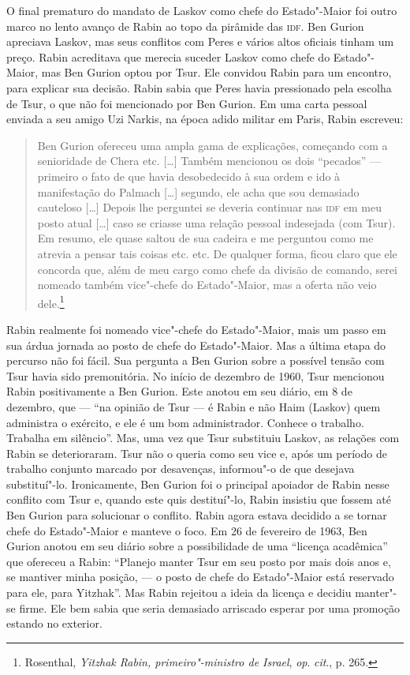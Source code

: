 O final prematuro do mandato de Laskov como chefe do Estado"-Maior foi
outro marco no lento avanço de Rabin ao topo da pirâmide das \textsc{idf}. Ben
Gurion apreciava Laskov, mas seus conflitos com Peres e vários altos
oficiais tinham um preço. Rabin acreditava que merecia suceder Laskov
como chefe do Estado"-Maior, mas Ben Gurion optou por Tsur. Ele convidou
Rabin para um encontro, para explicar sua decisão. Rabin sabia que Peres
havia pressionado pela escolha de Tsur, o que não foi mencionado por Ben
Gurion. Em uma carta pessoal enviada a seu amigo Uzi Narkis, na época
adido militar em Paris, Rabin escreveu: 

\begin{quote}
Ben Gurion ofereceu uma ampla
gama de explicações, começando com a senioridade de Chera etc. {[}\ldots{}{]}
Também mencionou os dois ``pecados'' --- primeiro o fato de que havia
desobedecido à sua ordem e ido à manifestação do Palmach {[}\ldots{}{]} segundo, ele
acha que sou demasiado cauteloso {[}\ldots{}{]} Depois lhe perguntei se deveria
continuar nas \textsc{idf} em meu posto atual {[}\ldots{}{]} caso se criasse uma relação
pessoal indesejada (com Tsur). Em resumo, ele quase saltou de sua
cadeira e me perguntou como me atrevia a pensar tais coisas etc. etc.
De qualquer forma, ficou claro que ele concorda que, além de meu cargo
como chefe da divisão de comando, serei nomeado também vice"-chefe do
Estado"-Maior, mas a oferta não veio dele.\footnote{Rosenthal, \emph{Yitzhak Rabin, primeiro"-ministro de Israel}, \emph{op}. \emph{cit}., p. 265.}
\end{quote}

Rabin realmente foi nomeado vice"-chefe do Estado"-Maior, mais um passo em
sua árdua jornada ao posto de chefe do Estado"-Maior. Mas a última etapa
do percurso não foi fácil. Sua pergunta a Ben Gurion sobre a possível
tensão com Tsur havia sido premonitória. No início de dezembro de 1960,
Tsur mencionou Rabin positivamente a Ben Gurion. Este anotou em
seu diário, em 8 de dezembro, que --- ``na opinião de Tsur --- é Rabin e não
Haim (Laskov) quem administra o exército, e ele é um bom administrador.
Conhece o trabalho. Trabalha em silêncio''. Mas, uma vez que Tsur
substituiu Laskov, as relações com Rabin se deterioraram. Tsur não o
queria como seu vice e, após um período de trabalho conjunto marcado por
desavenças, informou"-o de que desejava substituí"-lo. Ironicamente, Ben
Gurion foi o principal apoiador de Rabin nesse conflito com Tsur e,
quando este quis destituí"-lo, Rabin insistiu que fossem até Ben Gurion
para solucionar o conflito. Rabin agora estava decidido a se tornar
chefe do Estado"-Maior e manteve o foco. Em 26 de fevereiro de 1963, Ben
Gurion anotou em seu diário sobre a possibilidade de uma ``licença
acadêmica'' que ofereceu a Rabin: ``Planejo manter Tsur em
seu posto por mais dois anos e, se mantiver minha posição, --- o posto de
chefe do Estado"-Maior está reservado para ele, para Yitzhak''. Mas Rabin
rejeitou a ideia da licença e decidiu manter"-se firme. Ele bem sabia que
seria demasiado arriscado esperar por uma promoção estando no exterior.

